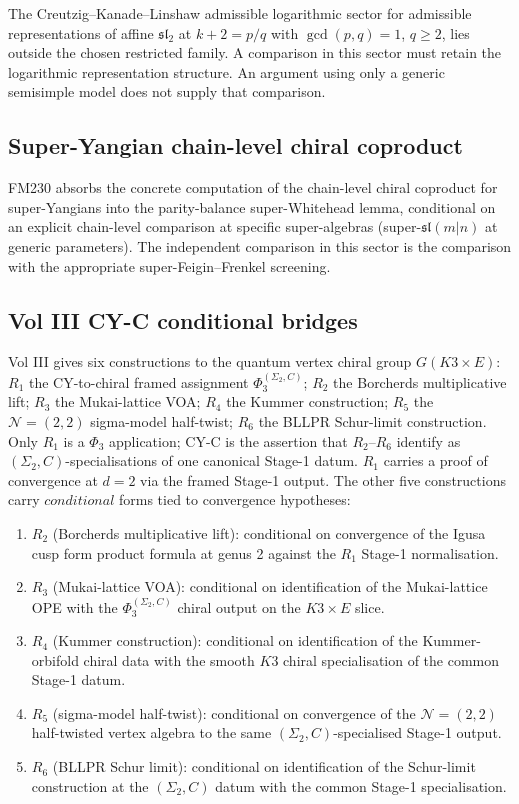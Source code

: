 The Creutzig--Kanade--Linshaw admissible logarithmic sector for
admissible representations of affine \(\mathfrak{sl}_2\) at
\(k + 2 = p/q\) with \(\gcd(p, q) = 1\), \(q \geq 2\), lies outside the
chosen restricted family. A comparison in this sector must retain the
logarithmic representation structure. An argument using only a generic
semisimple model does not supply that comparison.

\subsection{Super-Yangian chain-level chiral coproduct}
\label{v4-sec:super-yangian}

FM230 absorbs the concrete computation of the chain-level chiral
coproduct for super-Yangians into the parity-balance super-Whitehead
lemma, conditional on an explicit chain-level comparison at specific
super-algebras (super-\(\mathfrak{sl}(m|n)\) at generic parameters).
The independent comparison in this sector is the comparison with
the appropriate super-Feigin--Frenkel screening.

\subsection{Vol III CY-C conditional bridges}
\label{v4-sec:cy-c-conditional}

Vol III gives six constructions to the quantum vertex chiral group
\(G(K3\times E)\): \(R_1\)
the CY-to-chiral framed assignment \(\Phi_3^{(\Sigma_2,C)}\); \(R_2\)
the Borcherds multiplicative lift; \(R_3\) the Mukai-lattice VOA;
\(R_4\) the Kummer construction; \(R_5\) the
\(\mathcal{N}=(2,2)\) sigma-model half-twist; \(R_6\) the BLLPR
Schur-limit construction. Only \(R_1\) is a \(\Phi_3\) application;
CY-C is the assertion that \(R_2\)--\(R_6\) identify as
\((\Sigma_2, C)\)-specialisations of one canonical Stage-1 datum.
\(R_1\) carries a proof of convergence at \(d = 2\) via the framed
Stage-1 output. The other five constructions carry
\(conditional\) forms tied to convergence hypotheses:

\begin{enumerate}
 \item \(R_2\) (Borcherds multiplicative lift): conditional on
 convergence of the Igusa cusp form product formula at genus 2
 against the \(R_1\) Stage-1 normalisation.
 \item \(R_3\) (Mukai-lattice VOA): conditional on identification of
 the Mukai-lattice OPE with the \(\Phi_3^{(\Sigma_2,C)}\) chiral output
 on the \(K3\times E\) slice.
 \item \(R_4\) (Kummer construction): conditional on identification of
 the Kummer-orbifold chiral data with the smooth \(K3\) chiral
 specialisation of the common Stage-1 datum.
 \item \(R_5\) (sigma-model half-twist): conditional on convergence of
 the \(\mathcal{N}=(2,2)\) half-twisted vertex algebra to the same
 \((\Sigma_2,C)\)-specialised Stage-1 output.
 \item \(R_6\) (BLLPR Schur limit): conditional on identification of
 the Schur-limit construction at the \((\Sigma_2,C)\) datum with
 the common Stage-1 specialisation.
\end{enumerate}

